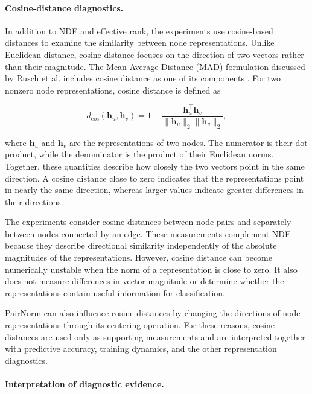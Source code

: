 \documentclass[english]{lni}
\begin{document}
\paragraph{Cosine-distance diagnostics.}

In addition to NDE and effective rank, the experiments use cosine-based distances to examine the similarity between node
representations. Unlike Euclidean distance, cosine distance focuses on the direction of two vectors rather than their magnitude. The Mean Average Distance (MAD) formulation discussed by Rusch et al. includes cosine distance as one of its components
\cite{rusch2023oversmoothing}. For two nonzero node representations, cosine distance is defined as

\begin{equation}
d_{\cos}(\mathbf{h}_u,\mathbf{h}_v)
=
1-
\frac{
\mathbf{h}_u^{\top}\mathbf{h}_v
}{
\|\mathbf{h}_u\|_2\|\mathbf{h}_v\|_2
},
\label{eq:cosine-distance}
\end{equation}

where $\mathbf{h}_u$ and $\mathbf{h}_v$ are the representations of two nodes. The numerator is their dot product, while the
denominator is the product of their Euclidean norms. Together, these quantities describe how closely the two vectors point
in the same direction. A cosine distance close to zero indicates that the representations point in nearly the same
direction, whereas larger values indicate greater differences in their directions.

The experiments consider cosine distances between node pairs and separately between nodes connected by an edge. These
measurements complement NDE because they describe directional similarity independently of the absolute magnitudes of the
representations. However, cosine distance can become numerically unstable when the norm of a representation is
close to zero. It also does not measure differences in vector magnitude or determine whether the representations contain useful information for classification.

PairNorm can also influence cosine distances by changing the directions of node representations through its centering
operation. For these reasons, cosine distances are used only as supporting measurements and are interpreted together with predictive accuracy, training dynamics, and the other representation diagnostics.

\paragraph{Interpretation of diagnostic evidence.}
\end{document}
